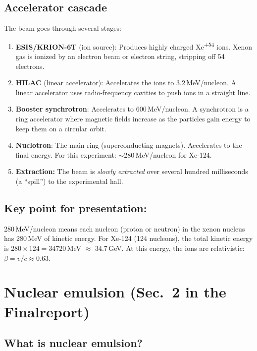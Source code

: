 \documentclass[12pt,a4paper]{article}
\begin{document}
\subsection{Accelerator cascade}

The beam goes through several stages:

\begin{enumerate}
  \item \textbf{ESIS/KRION-6T} (ion source): Produces highly charged
        Xe\textsuperscript{+54} ions. Xenon gas is ionized by an
        electron beam or electron string, stripping off 54 electrons.
  \item \textbf{HILAC} (linear accelerator): Accelerates the ions to
        3.2\,MeV/nucleon. A linear accelerator uses radio-frequency
        cavities to push ions in a straight line.
  \item \textbf{Booster synchrotron}: Accelerates to 600\,MeV/nucleon.
        A synchrotron is a ring accelerator where magnetic fields
        increase as the particles gain energy to keep them on a
        circular orbit.
  \item \textbf{Nuclotron}: The main ring (superconducting magnets).
        Accelerates to the final energy. For this experiment:
        $\sim$280\,MeV/nucleon for Xe-124.
  \item \textbf{Extraction:} The beam is \emph{slowly extracted} over
        several hundred milliseconds (a ``spill'') to the experimental
        hall.
\end{enumerate}

\subsection{Key point for presentation:}

280\,MeV/nucleon means each nucleon (proton or neutron) in the
xenon nucleus has 280\,MeV of kinetic energy. For Xe-124 (124
nucleons), the total kinetic energy is $280 \times 124 = 34720$\,MeV
$\approx$ 34.7\,GeV. At this energy, the ions are relativistic:
$\beta = v/c \approx 0.63$.

\section{Nuclear emulsion (Sec.~2 in the Finalreport)}

\subsection{What is nuclear emulsion?}
\end{document}
